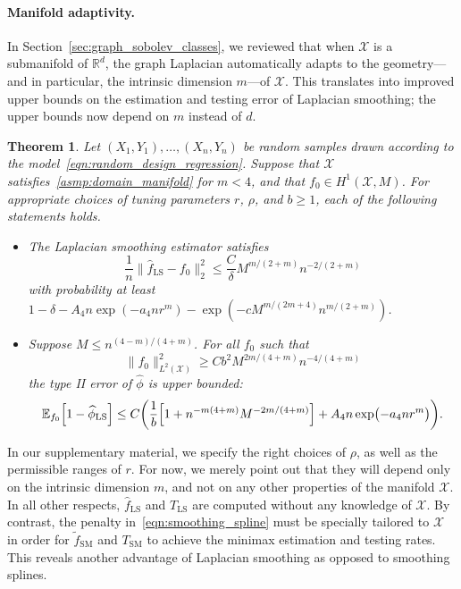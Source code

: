 \documentclass[twoside]{article}
\newcommand{\Reals}{\mathbb{R}}
\newcommand{\1}{\mathbf{1}}
\newcommand{\Rd}{\Reals^d}
\newcommand{\Xset}{\mathcal{X}}
\newcommand{\Leb}{L}
\newcommand{\Ebb}{\mathbb{E}}
\newcommand{\wt}[1]{\widetilde{#1}}
\newcommand{\wh}[1]{\widehat{#1}}
\newcommand{\LS}{\mathrm{LS}}
\newcommand{\SM}{\mathrm{SM}}
\newtheorem{theorem}{Theorem}
\theoremstyle{definition}
\theoremstyle{remark}
\begin{document}
\paragraph{Manifold adaptivity.} 

In Section~\ref{sec:graph_sobolev_classes}, we reviewed that when $\Xset$ is a submanifold of $\Rd$, the graph Laplacian automatically adapts to the geometry---and in particular, the intrinsic dimension $m$---of $\Xset$. This translates into improved upper bounds on the estimation and testing error of Laplacian smoothing; the upper bounds now depend on $m$ instead of $d$.

\begin{theorem}
	\label{thm:laplacian_smoothing_manifold}
	Let $(X_1,Y_1),\ldots,(X_n,Y_n)$ be random samples drawn according to the model~\eqref{eqn:random_design_regression}. Suppose that $\Xset$ satisfies~\ref{asmp:domain_manifold} for $m < 4$, and that $f_0 \in H^1(\Xset,M)$. For appropriate choices of tuning parameters $r$, $\rho$, and $b \geq 1$, each of the following statements holds.
	\begin{itemize}
		\item The Laplacian smoothing estimator satisfies
		\begin{equation*}
		\frac{1}{n}\bigl\|\wh{f}_{\LS} - f_0\bigr\|_2^2 \leq \frac{C}{\delta}M^{m/(2 + m)}n^{-2/(2 + m)}
		\end{equation*}
		with probability at least $1 - \delta - A_4n\exp(-a_4nr^m) - \exp(-c M^{m/(2m + 4)} n^{m/(2+m)})$.
		\item Suppose $M \leq n^{(4 - m)/(4 + m)}$. For all $f_0$ such that
		\begin{equation*}
		\bigl\|f_0\bigr\|_{\Leb^2(\Xset)}^2 \geq C b^2 M^{2m/(4 + m)} n^{-4/(4 + m)}
		\end{equation*} 
		the type II error of $\wh{\phi}$ is upper bounded:
		\begin{equation*}
		\Ebb_{f_0}\Bigl[1 - \wh{\phi}_{\LS} \Bigr] \leq C\biggl(\frac{1}{b}\Bigl[1 + n^{-m(4 + m)}M^{-2m/(4 + m)}\Bigr] + A_4n\exp\bigl(-a_4nr^m\bigr)\biggr).
		\end{equation*}
	\end{itemize}
\end{theorem}
In our supplementary material, we specify the right choices of $\rho$, as well as the permissible ranges of $r$. For now, we merely point out that they will depend only on the intrinsic dimension $m$, and not on any other properties of the manifold $\Xset$. In all other respects, $\wh{f}_{\LS}$ and $T_{\LS}$ are computed without any knowledge of $\Xset$. By contrast, the penalty in~\eqref{eqn:smoothing_spline} must be specially tailored to $\Xset$ in order for $\wt{f}_{\SM}$ and $T_{\SM}$ to achieve the minimax estimation and testing rates. This reveals another advantage of Laplacian smoothing as opposed to smoothing splines.
\end{document}
